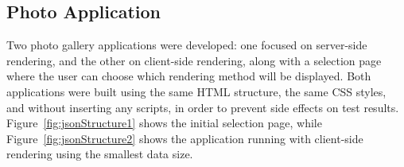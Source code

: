 \documentclass{sbc2019}%
\newcommand{\joey}[1]{\textcolor{darkgreen}{#1}}
\begin{document}

\subsection{Photo Application}
Two photo gallery applications were developed: one focused on server-side rendering, and the other on client-side rendering, along with a selection page where the user can choose which rendering method will be displayed. Both applications were built using the same HTML structure, the same CSS styles, and without inserting any scripts, in order to prevent side effects on test results. Figure~\ref{fig:jsonStructure1} shows the initial selection page, while Figure~\ref{fig:jsonStructure2} shows the application running with client-side rendering using the smallest data size.

\end{document}
